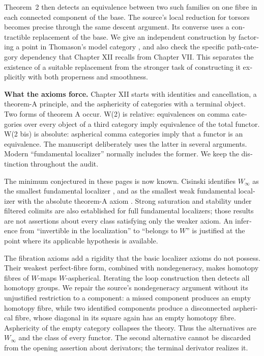 \begin{otherlanguage}{english}
Theorem~2 then detects an equivalence between two such families on one fibre in each connected component of the base. The source's local reduction for torsors becomes precise through the same descent argument. Its converse uses a contractible replacement of the base. We give an independent construction by factoring a point in Thomason's model category \citep[Theorem~4.9]{Thomason1980}, and also check the specific path-category dependency that Chapter XII recalls from Chapter VII. This separates the existence of a suitable replacement from the stronger task of constructing it explicitly with both properness and smoothness.

\medskip
\noindent\textbf{What the axioms force.}
Chapter XII starts with identities and cancellation, a theorem-A principle, and the asphericity of categories with a terminal object. Two forms of theorem A occur. W(2) is relative: equivalences on comma categories over every object of a third category imply equivalence of the total functor. W(2 bis) is absolute: aspherical comma categories imply that a functor is an equivalence. The manuscript deliberately uses the latter in several arguments. Modern “fundamental localizer” normally includes the former. We keep the distinction throughout the audit.

The minimum conjectured in these pages is now known. Cisinski identifies \(W_\infty\) as the smallest fundamental localizer \citep[Theorem~2.2.11]{Cisinski2004Minimal}, and as the smallest weak fundamental localizer with the absolute theorem-A axiom \citep[Theorem~6.1.18]{Cisinski2006}. Strong saturation and stability under filtered colimits are also established for full fundamental localizers; those results are not assertions about every class satisfying only the weaker axiom. An inference from “invertible in the localization” to “belongs to \(W\)” is justified at the point where its applicable hypothesis is available.

The fibration axioms add a rigidity that the basic localizer axioms do not possess. Their weakest perfect-fibre form, combined with nondegeneracy, makes homotopy fibres of \(W\)-maps \(W\)-aspherical. Iterating the loop construction then detects all homotopy groups. We repair the source's nondegeneracy argument without its unjustified restriction to a component: a missed component produces an empty homotopy fibre, while two identified components produce a disconnected aspherical fibre, whose diagonal in its square again has an empty homotopy fibre. Asphericity of the empty category collapses the theory. Thus the alternatives are \(W_\infty\) and the class of every functor. The second alternative cannot be discarded from the opening assertion about derivators; the terminal derivator realizes it.


\end{otherlanguage}
